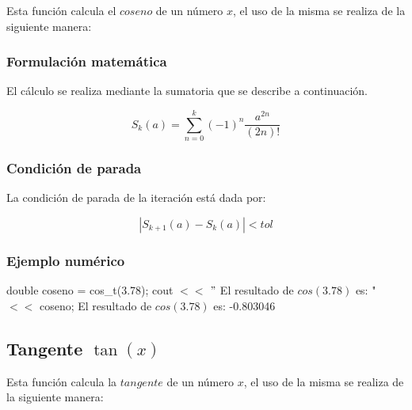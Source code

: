 \documentclass[10pt,a4paper]{article}
\begin{document}
	Esta función calcula el $coseno$ de un número $x$, el uso de la misma se realiza de la siguiente manera:
	
		\begin{center}
	\end{center}
	
	\subsubsection{Formulación matemática}
	
	El cálculo se realiza mediante la sumatoria que se describe a continuación.
	
	\begin{equation}\label{key8}
		S_{k}(a) = \sum_{n=0}^{k}(-1)^{n}\frac{a^{2n}}{(2n)!}
	\end{equation}
	
	\subsubsection{Condición de parada}
	
	La condición de parada de la iteración está dada por: 
	
	\begin{equation}\label{key9}
		\left\lvert S_{k+1}(a) - S_{k}(a) \right\lvert < tol
	\end{equation}
	
	\subsubsection{Ejemplo numérico}

	double coseno = cos{\_}t(3.78); \newline
	cout $<<$ $"$ El resultado de $cos(3.78)$ es: " $<<$ coseno; \newline
	El resultado de $cos(3.78)$ es: -0.803046\newline

	\subsection{Tangente $\tan(x)$}
	
	Esta función calcula la $tangente$ de un número $x$, el uso de la misma se realiza de la siguiente manera:
	
	\begin{center}
	\end{center}
	
\end{document}
